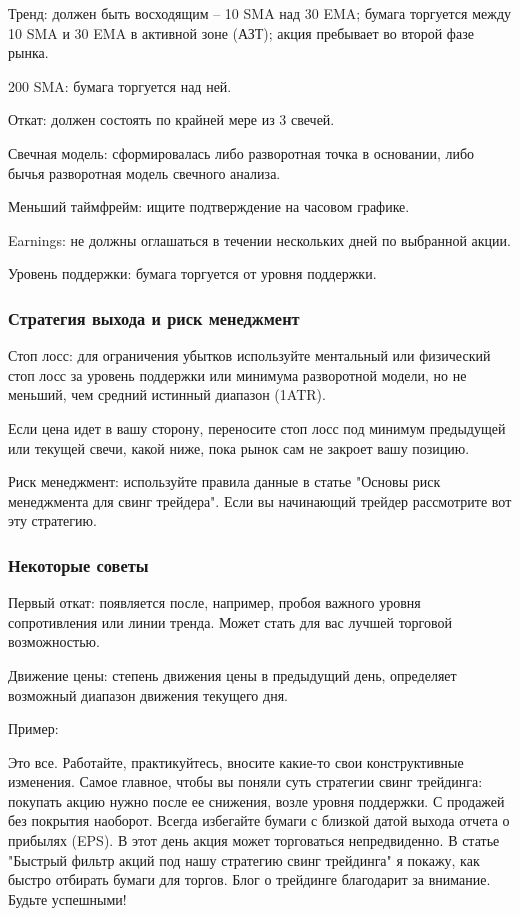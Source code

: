 \documentclass{book}
\begin{document}
Тренд: должен быть восходящим – 10 SMA над 30 EMA; бумага торгуется между 10 SMA и 30 EMA в активной зоне (АЗТ); акция пребывает во второй фазе рынка.

200 SMA: бумага торгуется над ней.

Откат: должен состоять по крайней мере из 3 свечей.

Свечная модель: сформировалась либо разворотная точка в основании, либо бычья разворотная модель свечного анализа.

Меньший таймфрейм: ищите подтверждение на часовом графике.

Earnings: не должны оглашаться в течении нескольких дней по выбранной акции.

Уровень поддержки: бумага торгуется от уровня поддержки.

\subsubsection{Стратегия выхода и риск менеджмент}

Стоп лосс: для ограничения убытков используйте ментальный или физический стоп лосс за уровень поддержки или минимума разворотной модели, но не меньший, чем средний истинный диапазон (1ATR).

Если цена идет в вашу сторону, переносите стоп лосс под минимум предыдущей или текущей свечи, какой ниже, пока рынок сам не закроет вашу позицию.

Риск менеджмент: используйте правила данные в статье "Основы риск
менеджмента для свинг трейдера". Если вы начинающий трейдер
рассмотрите вот эту стратегию.

\subsubsection{Некоторые советы}

Первый откат: появляется после, например, пробоя важного уровня сопротивления или линии тренда. Может стать для вас лучшей торговой возможностью.

Движение цены: степень движения цены в предыдущий день, определяет возможный диапазон движения текущего дня.

Пример:

Это все. Работайте, практикуйтесь, вносите какие-то свои конструктивные изменения. Самое главное, чтобы вы поняли суть стратегии свинг трейдинга: покупать акцию нужно после ее снижения, возле уровня поддержки. С продажей без покрытия наоборот. Всегда избегайте бумаги с близкой датой выхода отчета о прибылях (EPS). В этот день акция может торговаться непредвиденно. В статье "Быстрый фильтр акций под нашу стратегию свинг трейдинга" я покажу, как быстро отбирать бумаги для торгов. Блог о трейдинге благодарит за внимание. Будьте успешными!
\end{document}
